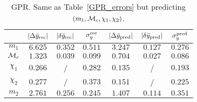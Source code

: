 \begin{table}
  \caption{\label{GPR_errors_temp} GPR. Same as Table~\ref{GPR_errors} but predicting $(m_1, {\cal{M}}_c, \chi_1, \chi_2)$. }
  \begin{center}
  \begin{tabular}{c|ccc|ccc}
  \hline\hline
  & $|\Delta \bar{y}_{\rm rec}|$  & $|\delta \bar{y}_{\rm rec}|$  & $\sigma_y^{\rm rec}$ & 
     $|\Delta \bar{y}_{\rm pred}|$ & $|\delta \bar{y}_{\rm pred}|$ & $\sigma_y^{\rm pred}$ \\
  \hline\hline
$m_1$          & $6.625$ & $0.352$ & $0.511$ & $3.247$ & $0.127$ & $0.276$ \\
${\cal{M}}_c$  & $1.323$ & $0.039$ & $0.099$ & $0.704$ & $0.027$ & $0.086$ \\
$\chi_1$       & $0.266$ &  /  & $0.282$ & $0.135$ &  /  & $0.193$ \\
$\chi_2$       & $0.277$ &  /  & $0.373$ & $0.151$ &  /  & $0.225$ \\
\hline
$m_2$          & $2.761$ & $0.256$ & $0.245$ & $1.407$ & $0.114$ & $0.351$ \\
  \hline\hline
  \end{tabular}
  \end{center}
\end{table}




